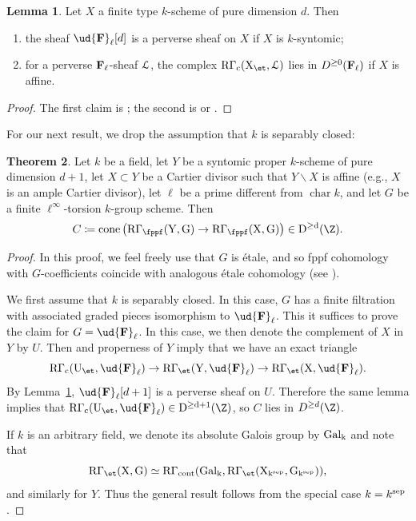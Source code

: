 \documentclass[11pt,reqno]{amsart}
\numberwithin{equation}{section}
\DeclareMathOperator{\charac}{char}
\theoremstyle{definition}
\newtheorem{thm}{Theorem}[subsection]
\newtheorem{lemma}[thm]{Lemma}
\begin{document}
\begin{lemma}\label{lemma:perverse-properties} Let $X$ a finite type $k$-scheme of pure dimension $d$. Then
\begin{enumerate}
    \item the sheaf $\ud{\bf{F}}_\ell[d]$ is a perverse sheaf on $X$ if $X$ is $k$-syntomic;
    \item for a perverse $\bf{F}_\ell$-sheaf $\cal{L}$, the complex $\rm{R}\Gamma_c(X_\et, \cal{L})$ lies in $D^{\geq 0}(\bf{F}_\ell)$ if $X$ is affine. 
\end{enumerate}
\end{lemma}
\begin{proof}
    The first claim is \cite[Cor.\ 1.4]{Il-perverse}; the second is \cite[Thm.\ 2.4]{Il-perverse} or \cite[Thm.\ 4.1.1]{BBD}.
\end{proof}


For our next result, we drop the assumption that $k$ is separably closed:

\begin{thm}\label{thm:etale-lefschetz} Let $k$ be a field, let $Y$ be a syntomic proper $k$-scheme of pure dimension $d+1$, let $X\subset Y$ be a Cartier divisor such that $Y\smallsetminus X$ is affine (e.g., $X$ is an ample Cartier divisor), let $\ell$ be a prime different from $\charac k$, and let $G$ be a finite $\ell^\infty$-torsion $k$-group scheme. Then
\[
C\coloneqq \rm{cone}\left(\rm{R}\Gamma_{\fppf}(Y, G) \to \rm{R}\Gamma_{\fppf}(X, G) \right) \in D^{\geq d}(\Z).
\] 
\end{thm}
\begin{proof}
    In this proof, we feel freely use that $G$ is \'etale, and so fppf cohomology with $G$-coefficients coincide with analogous \'etale cohomology (see \cite[Th.~11.7]{Brauer_3}). \smallskip

    We first assume that $k$ is separably closed. In this case, $G$ has a finite filtration with associated graded pieces isomorphism to $\ud{\bf{F}}_\ell$. This it suffices to prove the claim for $G=\ud{\bf{F}}_\ell$. In this case, we then denote the complement of $X$ in $Y$ by $U$. Then \cite[\href{https://stacks.math.columbia.edu/tag/0GKP}{Tag 0GKP}]{stacks-project} and properness of $Y$ imply that we have an exact triangle
    \[
    \rm{R}\Gamma_c(U_\et, \ud{\bf{F}}_\ell) \to \rm{R}\Gamma_\et(Y, \ud{\bf{F}}_\ell) \to \rm{R}\Gamma_\et(X, \ud{\bf{F}}_\ell).
    \]
    By Lemma~\ref{lemma:perverse-properties}, $\ud{\bf{F}}_\ell[d+1]$ is a perverse sheaf on $U$. Therefore the same lemma implies that $\rm{R}\Gamma_c(U_\et, \ud{\bf{F}}_\ell) \in D^{\geq d+1}(\Z)$, so $C$ lies in $D^{\geq d}(\Z)$. \smallskip

    If $k$ is an arbitrary field, we denote its absolute Galois group by $\rm{Gal}_k$ and note that 
    \[
    \rm{R}\Gamma_\et(X, G) \simeq \rm{R}\Gamma_{\rm{cont}}(\rm{Gal}_k, \rm{R}\Gamma_\et(X_{k^{\rm{sep}}}, G_{k^{\rm{sep}}})),
    \]
    and similarly for $Y$. Thus the general result follows from the special case $k = k^{\rm{sep}}$. 
\end{proof}
\end{document}
